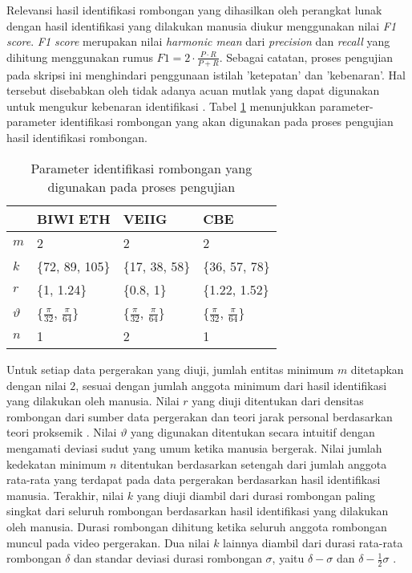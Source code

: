 Relevansi hasil identifikasi rombongan yang dihasilkan oleh perangkat lunak dengan hasil identifikasi yang dilakukan manusia diukur menggunakan nilai \textit{F1 score}. \textit{F1 score} merupakan nilai \textit{harmonic mean} dari \textit{precision} dan \textit{recall} yang dihitung menggunakan rumus $F1 = 2 \cdot \frac{P \cdot R}{P + R}$. Sebagai catatan, proses pengujian pada skripsi ini menghindari penggunaan istilah 'ketepatan' dan 'kebenaran'. Hal tersebut disebabkan oleh tidak adanya acuan mutlak yang dapat digunakan untuk mengukur kebenaran identifikasi \cite{wiratma:trajectory}. Tabel \ref{bab6:parameter} menunjukkan parameter-parameter identifikasi rombongan yang akan digunakan pada proses pengujian hasil identifikasi rombongan.

\begin{table}[h]
    \centering
    \begin{tabular}{p{1cm} p{2.25cm} p{2.25cm} p{2.25cm}}
        \hline
        & \textbf{BIWI ETH} & \textbf{VEIIG} & \textbf{CBE} \\
        \hline
        $m$ & 2 & 2 & 2 \\
        $k$ & \{72, 89, 105\} & \{17, 38, 58\} & \{36, 57, 78\} \\
        $r$ & \{1, 1.24\} & \{0.8, 1\} & \{1.22, 1.52\} \\
        $\vartheta$ & \{$\frac{\pi}{32}$, $\frac{\pi}{64}$\} & \{$\frac{\pi}{32}$, $\frac{\pi}{64}$\} & \{$\frac{\pi}{32}$, $\frac{\pi}{64}$\} \\
        $n$ & 1 & 2 & 1 \\
        \hline
    \end{tabular}
    \caption[Parameter identifikasi rombongan]{Parameter identifikasi rombongan yang digunakan pada proses pengujian}
    \label{bab6:parameter}
\end{table}

Untuk setiap data pergerakan yang diuji, jumlah entitas minimum $m$ ditetapkan dengan nilai $2$, sesuai dengan jumlah anggota minimum dari hasil identifikasi yang dilakukan oleh manusia. Nilai $r$ yang diuji ditentukan dari densitas rombongan dari sumber data pergerakan \cite{solera:06:range-reference} dan teori jarak personal berdasarkan teori proksemik \cite{hall:06:proxemic}. Nilai $\vartheta$ yang digunakan ditentukan secara intuitif dengan mengamati deviasi sudut yang umum ketika manusia bergerak. Nilai jumlah kedekatan minimum $n$ ditentukan berdasarkan setengah dari jumlah anggota rata-rata yang terdapat pada data pergerakan berdasarkan hasil identifikasi manusia. Terakhir, nilai $k$ yang diuji diambil dari durasi rombongan paling singkat dari seluruh rombongan berdasarkan hasil identifikasi yang dilakukan oleh manusia. Durasi rombongan dihitung ketika seluruh anggota rombongan muncul pada video pergerakan. Dua nilai $k$ lainnya diambil dari durasi rata-rata rombongan $\delta$ dan standar deviasi durasi rombongan $\sigma$, yaitu $\delta - \sigma$ dan $\delta - \frac{1}{2}\sigma$ \cite{wiratma:trajectory}.


